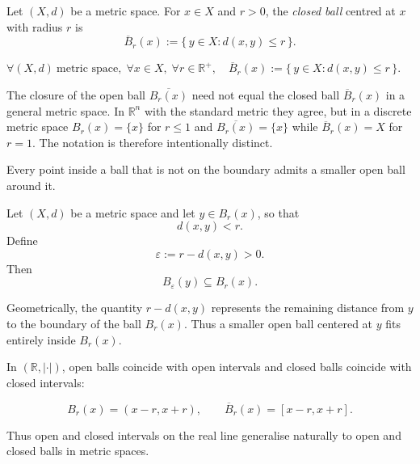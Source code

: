 \begin{tcolorbox}[colback=propbox, colframe=propborder, arc=2pt,
  left=6pt, right=6pt, top=4pt, bottom=4pt,
  title={\small\textbf{Definition (Closed Ball)}},
  fonttitle=\small\bfseries]
\begin{definition}
\label{def:closed-ball}
Let $(X,d)$ be a metric space.
For $x \in X$ and $r > 0$, the \emph{closed ball} centred at $x$ with radius $r$ is
\[
\overline{B}_r(x)
:=
\{\, y \in X : d(x,y) \le r \,\}.
\]
\end{definition}
\end{tcolorbox}

\begin{remark*}
$\forall (X,d)\ \text{metric space},\;
 \forall x \in X,\;
 \forall r \in \mathbb{R}^{+},\quad
 \overline{B}_r(x) := \{\, y \in X : d(x,y) \le r \,\}.$
\end{remark*}



\begin{remark*}
The closure of the open ball $\overline{B_r(x)}$ need not equal the closed
ball $\overline{B}_r(x)$ in a general metric space.
In $\mathbb{R}^n$ with the standard metric they agree, but in a discrete metric
space $B_r(x) = \{x\}$ for $r \le 1$ and $\overline{B_r(x)} = \{x\}$ while
$\overline{B}_r(x) = X$ for $r = 1$.
The notation is therefore intentionally distinct.
\end{remark*}



\begin{remark*}
Every point inside a ball that is not on the boundary admits a smaller
open ball around it.

Let $(X,d)$ be a metric space and let $y \in B_r(x)$, so that
\[
d(x,y) < r.
\]
Define
\[
\varepsilon := r - d(x,y) > 0.
\]
Then
\[
B_{\varepsilon}(y) \subseteq B_r(x).
\]

Geometrically, the quantity $r - d(x,y)$ represents the remaining
distance from $y$ to the boundary of the ball $B_r(x)$.
Thus a smaller open ball centered at $y$ fits entirely inside $B_r(x)$.
\end{remark*}

\begin{remark}
In $(\mathbb{R},|\cdot|)$, open balls coincide with open intervals and
closed balls coincide with closed intervals:

\[
B_r(x) = (x-r,x+r), \qquad \overline{B}_r(x) = [x-r,x+r].
\]

Thus open and closed intervals on the real line generalise naturally
to open and closed balls in metric spaces.
\end{remark}



